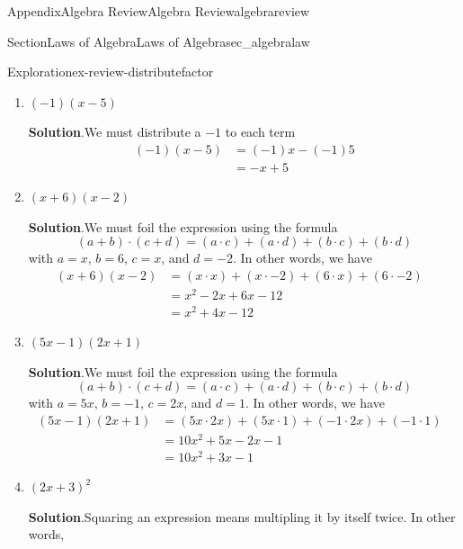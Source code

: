 \documentclass{tufte-book}
\newcommand{\blocktitlefont}{\relax}
\numberwithin{equation}{chapter}
\newcommand{\amp}{&}
\begin{document}
\begin{appendixptx}{Appendix}{Algebra Review}{}{Algebra Review}{}{}{algebrareview}
\begin{sectionptx}{Section}{Laws of Algebra}{}{Laws of Algebra}{}{}{sec_algebralaw}
\begin{exploration}{Exploration}{}{ex-review-distributefactor}
\begin{enumerate}[font=\bfseries,label=(\alph*),ref=\alph*]
\begin{align*}
5(x^2 - 3x + 2) \amp = 5x^2 - 15 x  + 10 
\end{align*}
%
\item{}\((-1)(x - 5)\)%
\par\smallskip%
\noindent\textbf{\blocktitlefont Solution}.\hypertarget{ex-review-distributefactor-3-2}{}\quad{}We must distribute a \(-1\) to each term%
\begin{align*}
(-1)(x - 5)	\amp = (-1)x - (-1)5 \\
\amp = -x + 5
\end{align*}
%
\item{}\((x+6)(x-2)\)%
\par\smallskip%
\noindent\textbf{\blocktitlefont Solution}.\hypertarget{ex-review-distributefactor-4-2}{}\quad{}We must foil the expression using the formula%
\begin{equation*}
(a + b) \cdot (c + d) = (a\cdot c) + (a \cdot d) + (b\cdot c) + (b\cdot d)
\end{equation*}
with \(a=x\), \(b=6\), \(c=x\), and \(d=-2\). In other words, we have%
\begin{align*}
(x+6)(x-2)\amp = (x\cdot x) + (x\cdot -2)+ (6\cdot x) + (6\cdot -2)\\
\amp = x^2 - 2x + 6x - 12 \amp \\
\amp = x^2 + 4x - 12
\end{align*}
%
\item{}\((5x-1)(2x+1)\)%
\par\smallskip%
\noindent\textbf{\blocktitlefont Solution}.\hypertarget{ex-review-distributefactor-5-2}{}\quad{}We must foil the expression using the formula%
\begin{equation*}
(a + b) \cdot (c + d) = (a\cdot c) + (a \cdot d) + (b\cdot c) + (b\cdot d)
\end{equation*}
with \(a=5x\), \(b=-1\), \(c=2x\), and \(d=1\). In other words, we have%
\begin{align*}
(5x-1)(2x+1)\amp = (5x\cdot 2x) + (5x\cdot 1)+ (-1\cdot 2x) + (-1\cdot 1)\\
\amp = 10x^2 + 5x - 2x - 1 \amp \\
\amp = 10x^2 + 3x - 1
\end{align*}
%
\item{}\((2x+3)^2\)%
\par\smallskip%
\noindent\textbf{\blocktitlefont Solution}.\hypertarget{ex-review-distributefactor-6-2}{}\quad{}Squaring an expression means multipling it by itself twice. In other words,%
\begin{align*}

\end{align*}
\end{enumerate}
\end{exploration}
\end{sectionptx}
\end{appendixptx}
\end{document}
